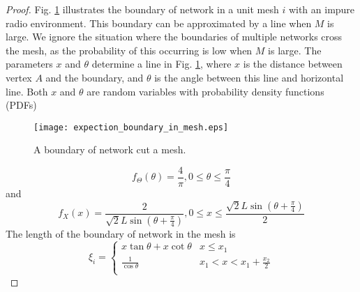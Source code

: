 \documentclass[conference]{IEEEtran}
\begin{document}
\begin{proof}
Fig. \ref{fig_boundary_in_a_mesh} illustrates the boundary of network in a unit mesh $i$ with an impure radio environment.
This boundary can be approximated by a line when $M$ is large.
We ignore the situation where the boundaries of multiple networks cross the mesh, as the probability of this occurring is low when $M$ is large.
The parameters $x$ and $\theta$ determine a line in Fig. \ref{fig_boundary_in_a_mesh}, where $x$ is the distance between vertex $A$ and the
boundary, and $\theta$ is the angle between this line and horizontal line.
Both $x$ and $\theta$ are random variables with probability density functions (PDFs)
\begin{figure}[!t]
\centering
\texttt{[image: expection\_boundary\_in\_mesh.eps]}
\caption{A boundary of network cut a mesh.} \label{fig_boundary_in_a_mesh}
\end{figure}
\begin{equation}
{f_\Theta }(\theta ) = \frac{4}{\pi },0 \le \theta  \le \frac{\pi }{4}
\end{equation}
and
\begin{equation}
{f_X}(x) = \frac{2}{{\sqrt 2 L\sin \left( {\theta  + \frac{\pi }{4}} \right)}},0 \le x \le \frac{{\sqrt 2 L\sin \left( {\theta  + \frac{\pi }{4}} \right)}}{2}
\end{equation}
The length of the boundary of network in the mesh is
\begin{equation}
{\xi _i} = \left\{ {\begin{array}{*{20}{c}}
   {x\tan \theta  + x\cot \theta } & {x \le {x_1}}  \\
   {\frac{1}{{\cos \theta }}} & {{x_1} < x < {x_1} + \frac{{{x_2}}}{2}}  \\
\end{array}} \right.
\end{equation}


\end{proof}
\end{document}
